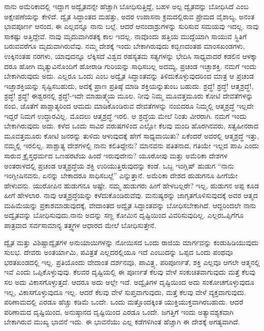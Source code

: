 ನಾನು ಅಮೆರಿಕಾದಲ್ಲಿ ಇದ್ದಾಗ ಅದ್ವೈತವನ್ನೇ ಹೆಚ್ಚಾಗಿ ಬೋಧಿಸುತ್ತಿದ್ದೆ, ಬಹಳ ಅಲ್ಪ ದ್ವೈತವನ್ನು ಬೋಧಿಸಿದೆ ಎಂಬ ಅಕ್ಷೇಪಣೆಯನ್ನು ಕೇಳಿದೆ. ದ್ವೈತ ಸಿದ್ಧಾಂತದ ಮಹತ್ತು, ಅದರ ಉಪಾಸನಾ ಕ್ರಮದಲ್ಲಿರುವ ಪ್ರೇಮದ ವೈಶಾಲ್ಯ, ಅನಂತ ಭಾವಪೂರ್ಣ ಆನಂದ, ಈ ಎಲ್ಲವನ್ನೂ ನಾನು ಬಲ್ಲೆ. ಆದರೆ ಆನಂದಾಶ್ರುಗಳನ್ನು ಸುರಿಸುವ ಸಮಯವು ಇದಲ್ಲ. ನಾವು ಸಾಕಷ್ಟು ಅತ್ತಿದ್ದೇವೆ. ನಾವು ಮೃದುವಾಗಿರತಕ್ಕ ಕಾಲ ಇದಲ್ಲ. ನಾವೊಂದು ಹತ್ತಿಯ ಮುದ್ದೆಯಾಗಿ ಸಾಯುವ ಸ್ಥಿತಿಗೆ ಬರುವವರೆಗೂ ಮೃದುವಾಗಿರುವೆವು. ನಮ್ಮ ದೇಶಕ್ಕೆ ಇಂದು ಬೇಕಾಗಿರುವುದು ಕಬ್ಬಿಣದಂತಹ ಮಾಂಸಖಂಡಗಳು, ಉಕ್ಕಿನಂತಹ ನರಗಳು, ಯಾವುದನ್ನೂ ಲೆಕ್ಕಿಸದೆ ವಿಶ್ವದ ರಹಸ್ಯತಮ ಸತ್ಯಗಳನ್ನು ಭೇದಿಸಿ ಸಾಧ್ಯವಾದರೆ ಕಡಲಿನ ಆಳಕ್ಕಾ ದರೂ ಹೋಗಿ ಮೃತ್ಯುವಿನೊಂದಿಗೆ ಹೋರಾಡಿ ಗುರಿಯನ್ನು ಸಾಧಿಸಬಲ್ಲ ಅದಮ್ಯ, ಪ್ರಚಂಡ ಇಚ್ಛಾಶಕ್ತಿ. ನಮಗೆ ಇಂದು ಬೇಕಾಗಿರುವುದು ಅದು. ಎಲ್ಲರೂ ಒಂದು ಎಂಬ ಅದ್ವೈತ ಸಿದ್ಧಾಂತವನ್ನು ತಿಳಿದುಕೊಳ್ಳುವುದರಿಂದ ಮಾತ್ರ ಆ ಪ್ರಚಂಡ ಇಚ್ಛಾಶಕ್ತಿಯನ್ನು ಸೃಷ್ಟಿಸಬಹುದು, ಅದಕ್ಕೆ ಪ್ರಾಣ ಪ್ರತಿಷ್ಠೆ ಮಾಡಿ ಶಕ್ತಿಯನ್ನುತುಂಬ ಬಹುದು. ಶ್ರದ್ಧೆ! ಶ್ರದ್ಧೆ! ಆತ್ಮಶ್ರದ್ಧೆ!, ಶ್ರದ್ಧೆ! ಶ್ರದ್ಧೆ! ಈಶ್ವರನಲ್ಲಿ ಶ್ರದ್ಧೆ!-ಇದೇ ಮಾಹಾತ್ಮ್ಯೆಯ ಮೂಲ. ನೀವು ನಿಮ್ಮ ಮೂವತ್ತಮೂರು ಕೋಟಿ ದೇವತೆಗಳನ್ನು ನಂಬಿ, ಜೊತೆಗೆ ಪಾಶ್ಚಾತ್ಯರಿಂದ ಆಮದು ಮಾಡಿಕೊಂಡಿರುವ ದೇವತೆಗಳನ್ನು ನಂಬಿದರೂ ನಿಮ್ಮಲ್ಲಿ ಆತ್ಮಶ್ರದ್ಧೆ ಇಲ್ಲದೇ ಇದ್ದರೆ ನಿಮಗೆ ಉದ್ಧಾರವಿಲ್ಲ. ಮೊದಲು ಆತ್ಮಶ್ರದ್ಧೆ ಇರಲಿ. ಆ ಶ್ರದ್ಧೆಯ ಮೇಲೆ ನಿಂತು ವೀರರಾಗಿ. ನಮಗೆ ಇಂದು ಬೇಕಾಗಿರುವುದು ಅದು. ಕಳೆದ ಒಂದು ಸಾವಿರ ವರುಷಗಳಿಂದ ಎಲ್ಲೋ ಕೆಲವು ಮಂದಿ ಹೊರಗಿನವರು, ಸತ್ವಹೀನರಾದ ಮೂವತ್ತಮೂರು ಕೋಟಿ ಜನರನ್ನು ತುಳಿದು ಆಳುವುದಕ್ಕೆ ಹೇಗೆ ಸಾಧ್ಯವಾಯಿತು? ಏಕೆಂದರೆ ಅವರಲ್ಲಿ ಆತ್ಮಶ್ರದ್ಧೆ ಇತ್ತು, ನಮ್ಮಲ್ಲಿ ಇರಲಿಲ್ಲ. ಪಾಶ್ಚಾತ್ಯ ದೇಶಗಳಲ್ಲಿ ನಾನು ಕಲಿತಿದ್ದೇನು? ಮಾನವನು ಪತಿತನಾದ, ಗತಿಯೇ ಇಲ್ಲದ ಪಾಪಿ ಎಂದು ಸಾರುವ ಕ್ರೈಸ್ತಧರ್ಮದ ಒಣ\break ಹರಟೆಯ ಹಿಂದೆ ಇರುವುದೇನು? ಯೂರೋಪು ಮತ್ತು ಅಮೆರಿಕಾ ದೇಶಗಳ ಅಂತರಾಳದಲ್ಲಿ ಪ್ರಚಂಡ ಆತ್ಮಶ್ರದ್ಧೆಯ ಶಕ್ತಿ ಉರಿಯುತ್ತಿರುವುದನ್ನು ಕಂಡೆ. ಒಬ್ಬ ಇಂಗ್ಲಿಷ್​ ಹುಡುಗ “ನಾನು ಇಂಗ್ಲೀಷಿನವನು, ಏನನ್ನು ಬೇಕಾದರೂ ಸಾಧಿಸಬಲ್ಲೆ” ಎನ್ನುತ್ತಾನೆ. ಅಮೆರಿಕಾ ದೇಶದ ಹುಡುಗನೂ ಹೀಗೆಯೇ ಹೇಳುವನು. ಯುರೋಪಿನ ಹುಡುಗನೂ ಅಷ್ಟೇ. ನಮ್ಮ ಹುಡುಗರು ಹೀಗೆ ಹೇಳಬಲ್ಲರೇ? ಇಲ್ಲ, ಹುಡುಗನ ಅಪ್ಪ ಕೂಡ ಹೀಗೆ ಹೇಳಲಾರ. ನಾವು ಆತ್ಮಶ್ರದ್ಧೆಯನ್ನು ಕಳೆದುಕೊಂಡಿರುವೆವು. ಮನುಷ್ಯರನ್ನು ಜಾಗೃತಗೊಳಿಸುವುದಕ್ಕೆ ಅವರ ಆತ್ಮದ ಮಹಿಮೆಯನ್ನು ಪ್ರಕಾಶಮಾಡುವುದಕ್ಕೆ, ವೇದಾಂತದ ಅದ್ವೈತ ಸಿದ್ಧಾಂತವನ್ನು ಬೋಧಿಸಬೇಕಾಗಿದೆ. ಆದ್ದರಿಂದಲೇ ನಾನು ಅದ್ವೈತವನ್ನು ಬೋಧಿಸುವುದು.\break ನಾನು ಅದನ್ನು ಸಣ್ಣ ಕೋಮಿನ ದೃಷ್ಟಿಯಿಂದ ವಿವರಿಸುವುದಿಲ್ಲ. ಎಲ್ಲರ\break ಒಪ್ಪಿಗೆಗೂ ಪಾತ್ರವಾದ ಸರ್ವಸಾಮಾನ್ಯ ತತ್ತ್ವಗಳ ಆಧಾರದ ಮೇಲೆ ಬೋಧಿಸು\-ತ್ತೇನೆ.

ದ್ವೈತ ಮತ್ತು ವಿಶಿಷ್ಟಾದ್ವೈತಗಳ ಅನುಯಾಯಿಗಳನ್ನು ನೋಯಿಸದ ಒಂದು ರಾಜಿಯ ಮಾರ್ಗವನ್ನು ಕಂಡುಹಿಡಿಯುವುದು ಸುಲಭ. ದೇವರು ಅಂತ\-ರ್ಯಾಮಿ, ಪವಿತ್ರತೆ ಎಲ್ಲದರಲ್ಲಿಯೂ ಇದೆ ಎಂಬುದನ್ನು ಒಪ್ಪದ ಒಂದು ಪಂಥವೂ ಭರತಖಂಡದಲ್ಲಿ ಇಲ್ಲ. ಪ್ರತಿಯೊಂದು ವೇದಾಂತ ದರ್ಶನವೂ, ಪಾವಿತ್ರ್ಯ, ಪರಿಪೂರ್ಣತೆ, ಶಕ್ತಿ ಎಲ್ಲವೂ ಆಗಲೇ ಆತ್ಮನಲ್ಲಿ ಇವೆ ಎಂದು ಒಪ್ಪಿಕೊಳ್ಳುವುವು. ಕೆಲವರ ದೃಷ್ಟಿಯಲ್ಲಿ ಈ ಪೂರ್ಣತೆ ಕೆಲವು ವೇಳೆ ಸಂಕುಚಿತವಾಗುವುದು ಮತ್ತೆ ಕೆಲವು ಸಲ ಅದು ವಿಕಾಸಗೊಳ್ಳುತ್ತದೆ. ಆದರೂ ಅದು ಅಲ್ಲೇ ಇದೆ. ಅದ್ವೈತಿಗಳ ದೃಷ್ಟಿಯಿಂದ ಅದು ಸಂಕೋಚಗೊಳ್ಳುವುದೂ ಇಲ್ಲ, ವಿಕಾಸಗೊಳ್ಳುವುದೂ ಇಲ್ಲ. ಆದರೆ ಕೆಲವು ವೇಳೆ ಸುಪ್ತವಾಗುವುದು, ಮತ್ತೆ ಕೆಲವು ವೇಳೆ ವ್ಯಕ್ತವಾಗುವುದು. ಪರಿಣಾಮದಲ್ಲಿ ಎರಡೂ ಹೆಚ್ಚು ಕಡಿಮೆ ಒಂದೇ. ಒಂದು ಮತ್ತೊಂದಕ್ಕಿಂತ ಯುಕ್ತಿಯುಕ್ತವಾಗಿರಬಹುದು. ಆದರೆ ಪರಿಣಾಮದ ದೃಷ್ಟಿಯಿಂದ, ಅನುಷ್ಠಾನದ ದೃಷ್ಟಿಯಿಂದ ಎರಡೂ ಒಂದೇ. ಜಗತ್ತಿಗೆ ಇಂದು ಅತ್ಯಾವಶ್ಯಕವಾಗಿ ಬೇಕಾಗಿರುವ ಮುಖ್ಯ ಭಾವನೆ ಇದು. ಈ ಭಾವನೆಯು ಎಲ್ಲ ಕಡೆಗಳಿಗಿಂತ ಹೆಚ್ಚಾಗಿ ಈ ದೇಶಕ್ಕೆ ಅಗತ್ಯವಾಗಿದೆ.

